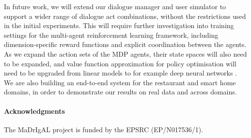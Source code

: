\documentclass[11pt]{article}
\begin{document}
In future work, we will extend our dialogue manager and user simulator to support a wider range of dialogue act combinations, without the restrictions used in the initial experiments.  This will require further investigation into training settings for the multi-agent reinforcement learning framework, including dimension-specific reward functions and explicit coordination between the agents.  As we expand the action sets of the MDP agents, their state spaces will also need to be expanded, and value function approximation for policy optimisation will need to be upgraded from linear models to for example deep neural networks \cite{Mrksic_ea-2015,Zhao:2016us}.  We are also building an end-to-end system for the restaurant and smart home domains, in order to demonstrate our results on real data and across domains.


\paragraph*{Acknowledgments}
The MaDrIgAL project is funded by the EPSRC (EP/N017536/1).



\end{document}
